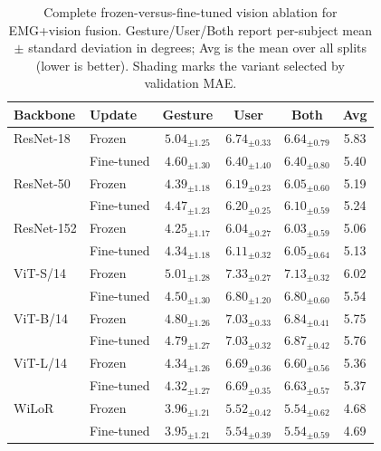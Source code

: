 \documentclass[letterpaper]{article} %
\begin{document}
\begin{table}[t]
\centering
\caption{Complete frozen-versus-fine-tuned vision ablation for EMG+vision
fusion. Gesture/User/Both report per-subject mean $\pm$ standard deviation in
degrees; Avg is the mean over all splits (lower is better).
Shading marks the variant selected by validation MAE.}
\label{tab:fusion_freeze_ablation}
\footnotesize
\setlength{\tabcolsep}{7.0pt}
\renewcommand{\arraystretch}{1.08}
\begin{tabular}{llcccc}
\toprule
Backbone & Update & Gesture & User & Both & Avg \\
\midrule
ResNet-18 & Frozen & $5.04_{\pm1.25}$ & $6.74_{\pm0.33}$ & $6.64_{\pm0.79}$ & 5.83 \\
\rowcolor{gray!12}
           & Fine-tuned & $4.60_{\pm1.30}$ & $6.40_{\pm1.40}$ & $6.40_{\pm0.80}$ & 5.40 \\
\midrule
\rowcolor{gray!12}
ResNet-50 & Frozen & $4.39_{\pm1.18}$ & $6.19_{\pm0.23}$ & $6.05_{\pm0.60}$ & 5.19 \\
          & Fine-tuned & $4.47_{\pm1.23}$ & $6.20_{\pm0.25}$ & $6.10_{\pm0.59}$ & 5.24 \\
\midrule
\rowcolor{gray!12}
ResNet-152 & Frozen & $4.25_{\pm1.17}$ & $6.04_{\pm0.27}$ & $6.03_{\pm0.59}$ & 5.06 \\
           & Fine-tuned & $4.34_{\pm1.18}$ & $6.11_{\pm0.32}$ & $6.05_{\pm0.64}$ & 5.13 \\
\midrule
ViT-S/14 & Frozen & $5.01_{\pm1.28}$ & $7.33_{\pm0.27}$ & $7.13_{\pm0.32}$ & 6.02 \\
\rowcolor{gray!12}
         & Fine-tuned & $4.50_{\pm1.30}$ & $6.80_{\pm1.20}$ & $6.80_{\pm0.60}$ & 5.54 \\
\midrule
\rowcolor{gray!12}
ViT-B/14 & Frozen & $4.80_{\pm1.26}$ & $7.03_{\pm0.33}$ & $6.84_{\pm0.41}$ & 5.75 \\
         & Fine-tuned & $4.79_{\pm1.27}$ & $7.03_{\pm0.32}$ & $6.87_{\pm0.42}$ & 5.76 \\
\midrule
\rowcolor{gray!12}
ViT-L/14 & Frozen & $4.34_{\pm1.26}$ & $6.69_{\pm0.36}$ & $6.60_{\pm0.56}$ & 5.36 \\
         & Fine-tuned & $4.32_{\pm1.27}$ & $6.69_{\pm0.35}$ & $6.63_{\pm0.57}$ & 5.37 \\
\midrule
\rowcolor{gray!12}
WiLoR & Frozen & $3.96_{\pm1.21}$ & $5.52_{\pm0.42}$ & $5.54_{\pm0.62}$ & 4.68 \\
      & Fine-tuned & $3.95_{\pm1.21}$ & $5.54_{\pm0.39}$ & $5.54_{\pm0.59}$ & 4.69 \\
\bottomrule
\end{tabular}
\end{table}
\end{document}
